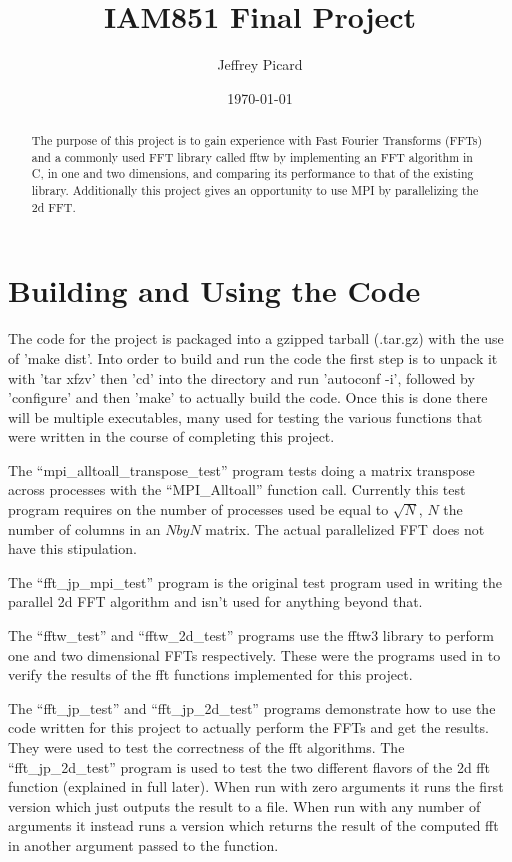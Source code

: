 \documentclass[12pt]{article}
\date{\small\today} \title{IAM851 Final Project} \author{Jeffrey Picard}
\begin{document}
\maketitle


\begin{abstract}
The purpose of this project is to gain experience with Fast Fourier Transforms (FFTs) and a commonly used FFT library called fftw by implementing an FFT
algorithm in C, in one and two dimensions, and comparing its performance to that of the existing library. Additionally this project gives an opportunity 
to use MPI by parallelizing the 2d FFT.
\end{abstract}


\section{Building and Using the Code}
The code for the project is packaged into a gzipped tarball (.tar.gz) with the use of 'make dist'. Into order to build and run the code the first step
is to unpack it with 'tar xfzv' then 'cd' into the directory and run 'autoconf -i', followed by 'configure' and then 'make' to actually build the code.
Once this is done there will be multiple executables, many used for testing the various functions that were written in the course of completing this 
project. 

The ``mpi\_alltoall\_transpose\_test'' program tests doing a matrix transpose across processes with the ``MPI\_Alltoall'' function call. Currently
this test program requires on the number of processes used be equal to $\sqrt{N}$, $N$ the number of columns in an $N by N$ matrix. The actual 
parallelized FFT does not have this stipulation.

The ``fft\_jp\_mpi\_test'' program is the original test program used in writing the parallel 2d FFT algorithm and isn't used for anything beyond that.

The ``fftw\_test'' and ``fftw\_2d\_test'' programs use the fftw3 library to perform one and two dimensional FFTs respectively. These were the programs
used in to verify the results of the fft functions implemented for this project.

The ``fft\_jp\_test'' and ``fft\_jp\_2d\_test'' programs demonstrate how to use the code written for this project to actually perform the FFTs and
get the results. They were used to test the correctness of the fft algorithms. The ``fft\_jp\_2d\_test'' program is used to test the two different
flavors of the 2d fft function (explained in full later). When run with zero arguments it runs the first version which just outputs the result to 
a file. When run with any number of arguments it instead runs a version which returns the result of the computed fft in another argument passed to the
function.
\end{document}

